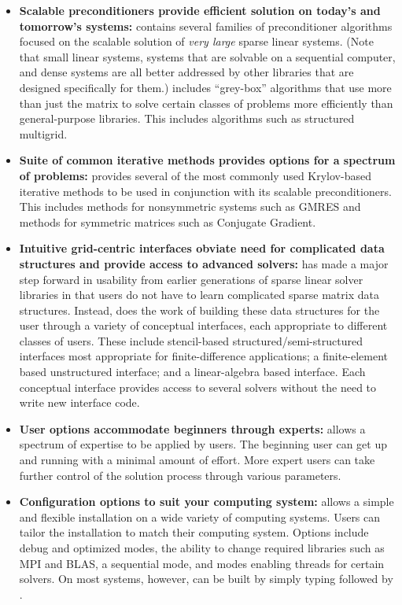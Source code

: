 \begin{itemize}

\item
{\bf Scalable preconditioners provide efficient solution on today's
and tomorrow's systems:} \hypre{} contains several families of
preconditioner algorithms focused on the scalable solution of {\it
very large} sparse linear systems. (Note that small linear systems,
systems that are solvable on a sequential computer, and dense systems
are all better addressed by other libraries that are designed
specifically for them.)
\hypre{} includes ``grey-box'' algorithms
that use more than just the matrix to solve certain classes of
problems more efficiently than general-purpose libraries. This
includes algorithms such as structured multigrid.


\item
{\bf Suite of common iterative methods provides options for a spectrum
of problems:} \hypre{} provides several of the most commonly used
Krylov-based iterative methods to be used in conjunction with its
scalable preconditioners. This includes methods for nonsymmetric
systems such as GMRES and methods for symmetric matrices such as
Conjugate Gradient.

\item
{\bf Intuitive grid-centric interfaces obviate need for complicated
data structures and provide access to advanced solvers:} \hypre{} has
made a major step forward in usability from earlier generations of
sparse linear solver libraries in that users do not have to learn
complicated sparse matrix data structures.  Instead, \hypre{} does the
work of building these data structures for the user through a variety
of conceptual interfaces, each appropriate to different classes of
users.  These include stencil-based structured/semi-structured
interfaces most appropriate for finite-difference applications; a
finite-element based unstructured interface; and a linear-algebra
based interface.  Each conceptual interface provides access to several
solvers without the need to write new interface code.

\item
{\bf User options accommodate beginners through experts:} \hypre{}
allows a spectrum of expertise to be applied by users. The beginning
user can get up and running with a minimal amount of effort. More
expert users can take further control of the solution process through
various parameters.

\item
{\bf Configuration options to suit your computing system:} \hypre{}
allows a simple and flexible installation on a wide variety of
computing systems.  Users can tailor the installation to match their
computing system. Options include debug and optimized modes, the
ability to change required libraries such as MPI and BLAS, a
sequential mode, and modes enabling threads for certain solvers.  On
most systems, however, \hypre{} can be built by simply typing
 followed by .


\end{itemize}
